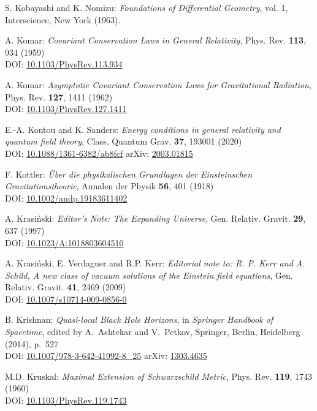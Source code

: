 \begin{thebibliography}{123}
S. Kobayashi and K. Nomizu:
{\em Foundations of Differential Geometry}, vol. 1,
Interscience, New York (1963).

A. Komar:
{\em Covariant Conservation Laws in General Relativity},
Phys. Rev. {\bf 113}, 934 (1959)\\
DOI: \href{https://doi.org/10.1103/PhysRev.113.934}{10.1103/PhysRev.113.934}

A. Komar:
{\em Asymptotic Covariant Conservation Laws for Gravitational Radiation},
Phys. Rev. {\bf 127}, 1411 (1962)\\
DOI: \href{https://doi.org/10.1103/PhysRev.127.1411}{10.1103/PhysRev.127.1411}

E.-A. Kontou and K. Sanders:
{\em Energy conditions in general relativity and quantum field theory},
Class. Quantum Grav. {\bf 37}, 193001 (2020)\\
DOI: \href{https://doi.org/10.1088/1361-6382/ab8fcf}{10.1088/1361-6382/ab8fcf}\hfill
arXiv: \href{https://arxiv.org/abs/2003.01815}{2003.01815}

F.  Kottler:
{\em \"Uber die physikalischen Grundlagen der Einsteinschen Gravitationstheorie},
Annalen der Physik {\bf 56}, 401 (1918)\\
DOI: \href{https://doi.org/10.1002/andp.19183611402}{10.1002/andp.19183611402}

A. Krasi\'nski:
{\em Editor's Note: The Expanding Universe},
Gen. Relativ. Gravit. {\bf 29}, 637 (1997)\\
DOI: \href{https://doi.org/10.1023/A:1018803604510}{10.1023/A:1018803604510}

A. Krasi\'nski, E. Verdaguer and R.P. Kerr:
{\em Editorial note to: R. P. Kerr and A. Schild, A new class of vacuum solutions of the Einstein field equations},
Gen. Relativ. Gravit. {\bf 41}, 2469 (2009)\\
DOI: \href{https://doi.org/10.1007/s10714-009-0856-0}{10.1007/s10714-009-0856-0}

B. Krishnan:
{\em Quasi-local Black Hole Horizons},
in {\em Springer Handbook of Spacetime}, edited by A.~Ashtekar and V.~Petkov,
Springer, Berlin, Heidelberg (2014), p.~527\\
DOI: \href{https://doi.org/10.1007/978-3-642-41992-8_25}{10.1007/978-3-642-41992-8\_25}\hfill
arXiv: \href{https://arxiv.org/abs/1303.4635}{1303.4635}

M.D. Kruskal:
{\em Maximal Extension of Schwarzschild Metric},
Phys. Rev. {\bf 119}, 1743 (1960)\\
DOI: \href{https://doi.org/10.1103/PhysRev.119.1743}{10.1103/PhysRev.119.1743}


\end{thebibliography}

